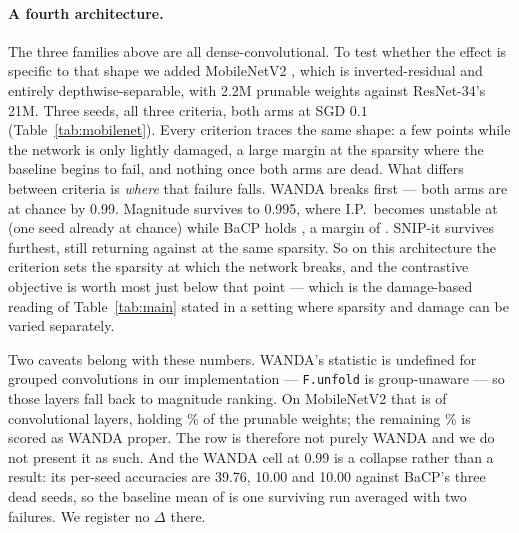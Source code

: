 \paragraph{A fourth architecture.}
The three families above are all dense-convolutional. To test whether the
effect is specific to that shape we added MobileNetV2
\citep{sandler2018mobilenetv2}, which is inverted-residual and entirely
depthwise-separable, with \num{2.2}M prunable weights against ResNet-34's
\num{21}M. Three seeds, all three criteria, both arms at SGD $0.1$
(Table~\ref{tab:mobilenet}). Every criterion traces the same shape: a few
points while the network is only lightly damaged, a large margin at the
sparsity where the baseline begins to fail, and nothing once both arms are
dead. What differs between criteria is \emph{where} that failure falls.
WANDA breaks first --- both arms are at chance by 0.99. Magnitude survives to
0.995, where I.P.\ becomes unstable at
 (one seed already at chance) while
BaCP holds , a margin of
. SNIP-it survives furthest, still
returning  against
 at the same sparsity. So on this
architecture the criterion sets the sparsity at which the network breaks, and
the contrastive objective is worth most just below that point --- which is
the damage-based reading of Table~\ref{tab:main} stated in a setting where
sparsity and damage can be varied separately.

Two caveats belong with these numbers. WANDA's statistic is undefined for
grouped convolutions in our implementation --- \verb|F.unfold| is
group-unaware --- so those layers fall back to magnitude ranking. On
MobileNetV2 that is  of
 convolutional layers, holding
\% of the prunable weights; the
remaining \% is scored as WANDA proper.
The row is therefore not purely WANDA and we do not present it as such. And
the WANDA cell at 0.99 is a collapse rather than a result: its per-seed
accuracies are \num{39.76}, \num{10.00} and \num{10.00} against BaCP's three
dead seeds, so the baseline mean of  is one
surviving run averaged with two failures. We register no $\Delta$ there.

